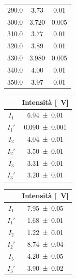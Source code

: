 \documentclass[10pt,oneside,a4paper]{article}
\begin{document}
\begin{minipage}[t]{.5\linewidth}
\begin{center}
\begin{tabular}{|c|c|c|}
290.0 &    3.73 &            0.01 \\
300.0 &    3.720 &            0.005 \\
310.0 &    3.77 &            0.01 \\
320.0 &    3.89 &            0.01 \\
330.0 &    3.980 &            0.005 \\
340.0 &    4.00 &            0.01 \\
350.0 &    3.97 &            0.01 \\
\bottomrule
\end{tabular}
\end{center}
\end{minipage}

\vspace{1cm}
\begin{minipage}[t]{.5\linewidth}
\begin{center}
\label{tab:stokesBS}
\begin{tabular}{c|c}
& Intensità [\SI{}{V}]  \\
\hline
     $I_1$  &        \SI{6.94 \pm 0.01}{} \\
     $I_1'$  &       \SI{0.090 \pm 0.001}{} \\
     \hline 
     $I_2$  &        \SI{4.04 \pm 0.01}{} \\
     $I_2'$  &       \SI{3.50 \pm 0.01}{} \\
     \hline 
     $I_3$  &        \SI{3.31 \pm 0.01}{} \\
     $I_3'$	&		 \SI{3.20 \pm 0.01}{} \\
\hline
\end{tabular}
\end{center}
\end{minipage}
\hspace{1em}
\begin{minipage}[t]{.5\linewidth}
\begin{center}
\label{tab:stokesHeNe}
\begin{tabular}{c|c}
& Intensità [\SI{}{V}]  \\
\hline
     $I_1$  &        \SI{7.95 \pm 0.05}{} \\
     $I_1'$  &       \SI{1.68 \pm 0.01}{} \\
     \hline 
     $I_2$  &        \SI{1.22 \pm 0.01}{} \\
     $I_2'$  &       \SI{8.74 \pm 0.04}{} \\
     \hline 
     $I_3$  &        \SI{4.20 \pm 0.05}{} \\
     $I_3'$	&		 \SI{3.90 \pm 0.02}{} \\
\hline
\end{tabular}
\end{center}
\end{minipage}
\end{document}
